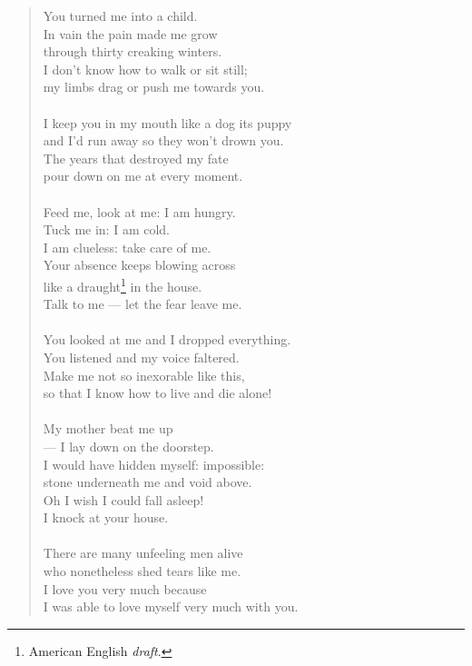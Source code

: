 \documentclass[11pt]{book}
\begin{document}
\begin{verse}
  You turned me into a child. \\
  In vain the pain made me grow \\
  through thirty creaking winters. \\
  I don't know how to walk or sit still; \\
  my limbs drag or push me towards you. \\
  \ \\[-1mm]
  I keep you in my mouth like a dog its puppy \\
  and I'd run away so they won't drown you. \\
  The years that destroyed my fate \\
  pour down on me at every moment. \\
  \ \\[-1mm]
  Feed me, look at me: I am hungry. \\
  Tuck me in: I am cold. \\
  I am clueless: take care of me. \\
  Your absence keeps blowing across \\
  like a draught\footnote{American English \emph{draft}.} in the house. \\
  Talk to me --- let the fear leave me. \\
  \ \\[-1mm]
  You looked at me and I dropped everything. \\
  You listened and my voice faltered. \\
  Make me not so inexorable like this, \\
  so that I know how to live and die alone! \\
  \ \\[-1mm]
  My mother beat me up \\
  --- I lay down on the doorstep. \\
  I would have hidden myself: impossible: \\
  stone underneath me and void above. \\
  Oh I wish I could fall asleep! \\
  I knock at your house. \\
  \ \\[-1mm]
  There are many unfeeling men alive \\
  who nonetheless shed tears like me. \\
  I love you very much because \\
  I was able to love myself very much with you.
\end{verse}
\end{document}
